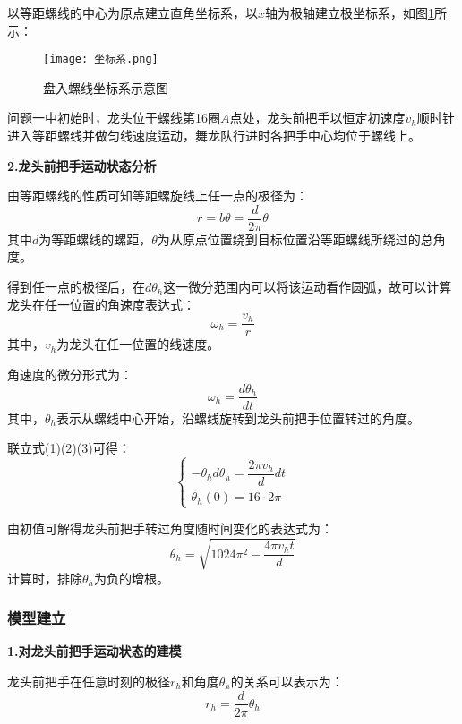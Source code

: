 \documentclass[withoutpreface,bwprint]{cumcmthesis} %
\begin{document}
	以等距螺线的中心为原点建立直角坐标系，以$x$轴为极轴建立极坐标系，如图\ref{坐标系}所示：
	\begin{figure}[H]
		\centering
		\texttt{[image: 坐标系.png]}
		\caption{盘入螺线坐标系示意图}
		\label{坐标系} %
	\end{figure}
	问题一中初始时，龙头位于螺线第16圈$A$点处，龙头前把手以恒定初速度$v_h$顺时针进入等距螺线并做匀线速度运动，舞龙队行进时各把手中心均位于螺线上。
	
	\textbf{2.龙头前把手运动状态分析}
	
	由等距螺线的性质\cite{1}可知等距螺旋线上任一点的极径为：
	\begin{equation}
		r=b\theta=\dfrac{d}{2\pi}\theta
	\end{equation}
	其中$d$为等距螺线的螺距，$\theta$为从原点位置绕到目标位置沿等距螺线所绕过的总角度。
	
	得到任一点的极径后，在$d\theta_h$这一微分范围内可以将该运动看作圆弧，故可以计算龙头在任一位置的角速度表达式：
	\begin{equation}
		\omega_h=\dfrac{v_h}{r}
	\end{equation}
	其中，$v_h$为龙头在任一位置的线速度。
	
	角速度的微分形式为：
	\begin{equation}
		\omega_h=\dfrac{d\theta_h}{dt}
	\end{equation}
	其中，$\theta_h$表示从螺线中心开始，沿螺线旋转到龙头前把手位置转过的角度。
	
	联立式(1)(2)(3)可得：
	\begin{equation}
		\begin{cases}
			-\theta_hd\theta_h=\dfrac{2\pi v_h}{d}dt\\
			\theta_h(0)=16\cdot 2\pi
		\end{cases}
	\end{equation}
	
	由初值可解得龙头前把手转过角度随时间变化的表达式为：
	\begin{equation}
		\theta_h=\sqrt{1024\pi ^2-\dfrac{4\pi v_ht}{d}}
	\end{equation}
	计算时，排除$\theta_h$为负的增根。
	\subsubsection{模型建立}
	\textbf{1.对龙头前把手运动状态的建模}
	
	龙头前把手在任意时刻的极径$r_h$和角度$\theta_h$的关系可以表示为：
	\begin{equation}
		r_h=\dfrac{d}{2\pi}\theta_h
	\end{equation}
	
\end{document}
